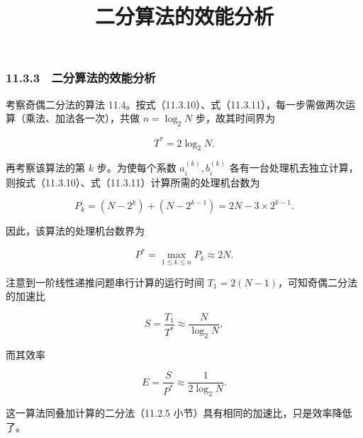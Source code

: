 \documentclass[
  10pt,
  fontset=fandol]{ctexart}
\title{二分算法的效能分析}
\author{}
\date{}
\begin{document}
\maketitle

\subsubsection{11.3.3　二分算法的效能分析}\label{ux4e8cux5206ux7b97ux6cd5ux7684ux6548ux80fdux5206ux6790}

考察奇偶二分法的算法 11.4。按式（11.3.10）、式（11.3.11），每一步需做两次运算（乘法、加法各一次），共做 \(n=\log_2 N\) 步，故其时间界为

\[
T^*=2\log_2 N.
\]

再考察该算法的第 \(k\) 步。为使每个系数 \(a_i^{(k)},b_i^{(k)}\) 各有一台处理机去独立计算，则按式（11.3.10）、式（11.3.11）计算所需的处理机台数为

\[
P_k=(N-2^k)+(N-2^{k-1})=2N-3\times2^{k-1}.
\]

因此，该算法的处理机台数界为

\[
P^*=\max_{1\le k\le n}P_k\approx2N.
\]

注意到一阶线性递推问题串行计算的运行时间 \(T_1=2(N-1)\)，可知奇偶二分法的加速比

\[
S=\frac{T_1}{T^*}\approx\frac{N}{\log_2 N},
\]

而其效率

\[
E=\frac{S}{P^*}\approx\frac{1}{2\log_2 N}.
\]

这一算法同叠加计算的二分法（11.2.5 小节）具有相同的加速比，只是效率降低了。
\end{document}
